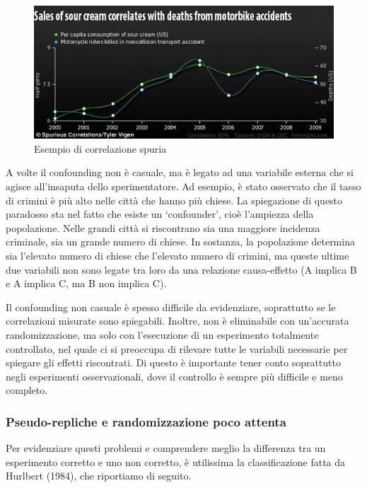 \documentclass[a4paper,12pt,oneside]{book}
\theoremstyle{definition}
\theoremstyle{definition}
\theoremstyle{definition}
\theoremstyle{remark}
\begin{document}
\begin{figure}

{\centering \includegraphics[width=0.9\linewidth]{_images/PannaAcida} 

}

\caption{Esempio di correlazione spuria}\label{fig:figName22}
\end{figure}

A volte il confounding non è casuale, ma è legato ad una variabile
esterna che si agisce all'insaputa dello sperimentatore. Ad esempio, è
stato osservato che il tasso di crimini è più alto nelle città che hanno
più chiese. La spiegazione di questo paradosso sta nel fatto che esiste
un `confounder', cioè l'ampiezza della popolazione. Nelle grandi città
si riscontrano sia una maggiore incidenza criminale, sia un grande
numero di chiese. In sostanza, la popolazione determina sia l'elevato
numero di chiese che l'elevato numero di crimini, ma queste ultime due
variabili non sono legate tra loro da una relazione causa-effetto (A
implica B e A implica C, ma B non implica C).

Il confounding non casuale è spesso difficile da evidenziare,
soprattutto se le correlazioni misurate sono spiegabili. Inoltre, non è
eliminabile con un'accurata randomizzazione, ma solo con l'esecuzione di
un esperimento totalmente controllato, nel quale ci si preoccupa di
rilevare tutte le variabili necessarie per spiegare gli effetti
riscontrati. Di questo è importante tener conto soprattutto negli
esperimenti osservazionali, dove il controllo è sempre più difficile e
meno completo.

\subsubsection{Pseudo-repliche e randomizzazione poco
attenta}\label{pseudo-repliche-e-randomizzazione-poco-attenta}

Per evidenziare questi problemi e comprendere meglio la differenza tra
un esperimento corretto e uno non corretto, è utilissima la
classificazione fatta da Hurlbert (1984), che riportiamo di seguito.
\end{document}
